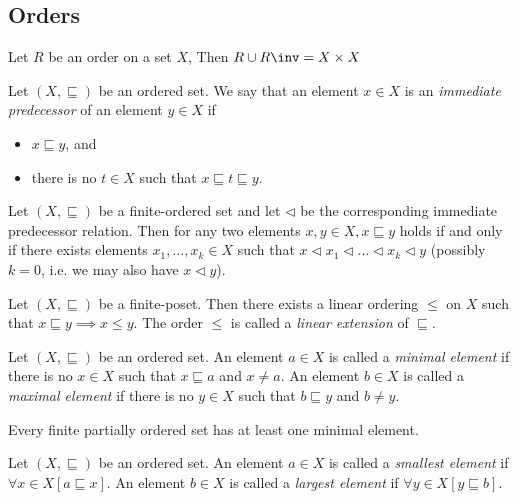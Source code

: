 \documentclass{classnotes}
\begin{document}
\subsection{Orders}
\begin{proposition}
    Let $R$ be an order on a set $X$, Then $R \cup R\inv = X \times X$
\end{proposition}
\begin{definition}
    Let $(X, \sqsubseteq)$ be an ordered set. We say that an element $x \in X$ is an \emph{immediate predecessor} of an element $y \in X$ if
    \begin{itemize}
        \item $x \sqsubseteq y$, and
        \item there is no $t \in X$ such that $x \sqsubseteq t \sqsubseteq y$.
    \end{itemize}
\end{definition}
\begin{proposition}
    Let $(X,\sqsubseteq)$ be a finite-ordered set and let $\lhd$ be the corresponding immediate predecessor relation.
    Then for any two elements $x,y \in X, x \sqsubseteq y$ holds if and only if there exists elements $x_1,\dots,x_k \in X$
    such that $x \lhd x_1 \lhd \dots \lhd x_k \lhd y$ (possibly $k=0$, i.e. we may also have $x \lhd y$).
\end{proposition}

\begin{theorem}
    Let $(X,\sqsubseteq)$ be a finite-poset. Then there exists a linear ordering $\le$ on $X$ such that $x \sqsubseteq y \implies x \le y$.
    The order $\le$ is called a \emph{linear extension} of $\sqsubseteq$.
\end{theorem}

\begin{definition}
    Let $(X,\sqsubseteq)$ be an ordered set. An element $a \in X$ is called a \emph{minimal element} if there is no $x \in X$ such that $x \sqsubseteq a$ and $x \ne a$.
    An element $b \in X$ is called a \emph{maximal element} if there is no $y \in X$ such that $b \sqsubseteq y$ and $b \ne y$.
\end{definition}

\begin{theorem}
    Every finite partially ordered set has at least one minimal element.
\end{theorem}

\begin{definition}
    Let $(X,\sqsubseteq)$ be an ordered set. An element $a \in X$ is called a \emph{smallest element} if $\forall x \in X [a \sqsubseteq x]$.
    An element $b \in X$ is called a \emph{largest element} if $\forall y \in X [y \sqsubseteq b]$.
\end{definition}
\end{document}
